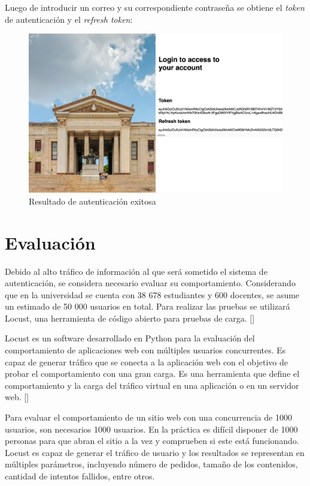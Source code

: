 Luego de introducir un correo y su correspondiente contraseña se obtiene el \textit{token} de autenticación y el \textit{refresh token}:

\begin{figure}[H]
	\centering
	\includegraphics[width=1\linewidth]{Graphics/interfaz_token_success}
	\caption{Resultado de autenticación exitosa}
	\label{fig:interfaztokensuccess}
\end{figure}

\section{Evaluación}

Debido al alto tráfico de información al que será sometido el sistema de autenticación, se considera necesario evaluar su comportamiento. Considerando que en la universidad se cuenta con 38 678 estudiantes y 600 docentes, se asume un estimado de 50 000 usuarios en total. Para realizar las pruebas se utilizará Locust, una herramienta de código abierto para pruebas de carga. [\cite{dullmann2017caspa}] 

Locust es un software desarrollado en Python para la evaluación del comportamiento de aplicaciones web con múltiples usuarios concurrentes. Es capaz de generar tráfico que se conecta a la aplicación web con el objetivo de probar el comportamiento con una gran carga. Es una herramienta que define el comportamiento y la carga del tráfico virtual en una aplicación o en un servidor web. [\cite{pradeep2019pragmatic}]

Para evaluar el comportamiento de un sitio web con una concurrencia de 1000 usuarios, son necesarios 1000 usuarios. En la práctica es difícil disponer de 1000 personas para que abran el sitio a la vez y comprueben si este está funcionando. Locust es capaz de generar el tráfico de usuario y los resultados se representan en múltiples parámetros, incluyendo número de pedidos, tamaño de los contenidos, cantidad de intentos fallidos, entre otros.

